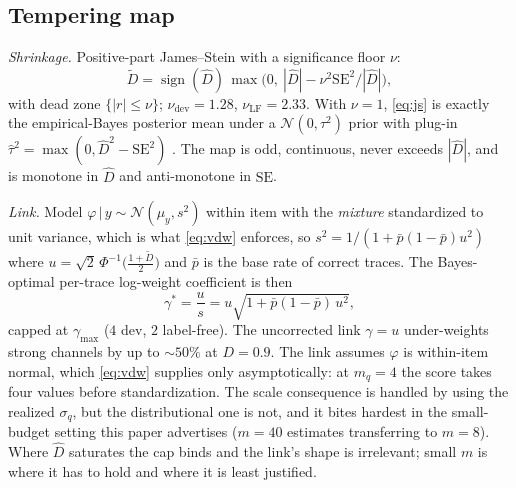 \documentclass[twoside,11pt]{article}
\newcommand{\Dhat}{\widehat{D}}
\newcommand{\sign}{\operatorname{sign}}
\begin{document}
\subsection{Tempering map}
\emph{Shrinkage.} Positive-part James--Stein with a significance floor $\nu$:
\begin{equation}\label{eq:js}
\tilde D=\sign(\Dhat)\,\max\!\big(0,\ |\Dhat|-\nu^2\mathrm{SE}^2/|\Dhat|\big),
\end{equation}
with dead zone $\{|r|\le\nu\}$; $\nu_{\mathrm{dev}}=1.28$, $\nu_{\mathrm{LF}}=2.33$. With $\nu=1$, \eqref{eq:js} is exactly the empirical-Bayes posterior mean under a $\mathcal{N}(0,\tau^2)$ prior with plug-in $\hat\tau^2=\max(0,\Dhat^2-\mathrm{SE}^2)$ \citep{james1961estimation}. The map is odd, continuous, never exceeds $|\Dhat|$, and is monotone in $\Dhat$ and anti-monotone in $\mathrm{SE}$.

\emph{Link.} Model $\varphi\,|\,y\sim\mathcal{N}(\mu_y,s^2)$ within item with the \emph{mixture} standardized to unit variance, which is what \eqref{eq:vdw} enforces, so $s^2=1/(1+\bar p(1-\bar p)u^2)$ where $u=\sqrt2\,\Phi^{-1}\!\big(\tfrac{1+\tilde D}{2}\big)$ and $\bar p$ is the base rate of correct traces. The Bayes-optimal per-trace log-weight coefficient is then
\begin{equation}\label{eq:link}
\gamma^\ast=\frac{u}{s}=u\sqrt{1+\bar p(1-\bar p)\,u^2},
\end{equation}
capped at $\gamma_{\max}$ ($4$ dev, $2$ label-free). The uncorrected link $\gamma=u$ under-weights strong channels by up to ${\sim}50\%$ at $D=0.9$. The link assumes $\varphi$ is within-item normal, which \eqref{eq:vdw} supplies only asymptotically: at $m_q{=}4$ the score takes four values before standardization. The scale consequence is handled by using the realized $\sigma_q$, but the distributional one is not, and it bites hardest in the small-budget setting this paper advertises ($m{=}40$ estimates transferring to $m{=}8$). Where $\Dhat$ saturates the cap binds and the link's shape is irrelevant; small $m$ is where it has to hold and where it is least justified.
\end{document}
